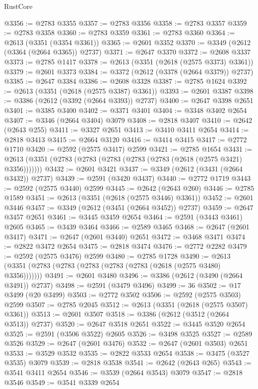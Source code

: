 \begin{lexlean}{RustCore}
\begin{coremodule}
@3356 := @2783 @3355
@3357 := @2783 @3356
@3358 := @2783 @3357
@3359 := @2783 @3358
@3360 := @2783 @3359
@3361 := @2783 @3360
@3364 := @2613 (@3351 (@3354 @3361))
@3365 := @2601 @3352
@3370 := @3349 (@2612 (@3364 (@2664 @3365)) @2737)
@3371 := @2647 @3370
@3372 := @2608 @3337
@3373 := @2785 @1417
@3378 := @2613 (@3351 (@2618 (@2575 @3373) @3361))
@3379 := @2601 @3373
@3384 := @3372 (@2612 (@3378 (@2664 @3379)) @2737)
@3385 := @2647 @3384
@3386 := @2608 @3328
@3387 := @2785 @1624
@3392 := @2613 (@3351 (@2618 (@2575 @3387) @3361))
@3393 := @2601 @3387
@3398 := @3386 (@2612 (@3392 (@2664 @3393)) @2737)
@3400 := @2647 @3398 @2651
@3401 := @3385 @3400
@3402 := @3371 @3401
@3404 := @3348 @3402 @2654
@3407 := @3346 (@2664 @3404) @3079
@3408 := @2818 @3407
@3410 := @2642 (@2643 @255)
@3411 := @3327 @2651
@3413 := @3410 @3411 @2654
@3414 := @2818 @3413
@3415 := @2664 @3120
@3416 := @3414 @3415
@3417 := @2772 @1710
@3420 := @2592 (@2575 @3417) @2599
@3421 := @2785 @1654
@3431 := @2613 (@3351 (@2783 (@2783 (@2783 (@2783 (@2783 (@2618 (@2575 @3421) @3356)))))))
@3432 := @2601 @3421
@3437 := @3349 (@2612 (@3431 (@2664 @3432)) @2737)
@3439 := @2591 (@3420 @3437)
@3440 := @2772 @1719
@3443 := @2592 (@2575 @3440) @2599
@3445 := @2642 (@2643 @260)
@3446 := @2785 @1589
@3451 := @2613 (@3351 (@2618 (@2575 @3446) @3361))
@3452 := @2601 @3446
@3457 := @3349 (@2612 (@3451 (@2664 @3452)) @2737)
@3459 := @2647 @3457 @2651
@3461 := @3445 @3459 @2654
@3464 := @2591 (@3443 @3461) @2605
@3465 := @3439 @3464
@3466 := @2589 @3465
@3468 := @2647 (@2601 @3417)
@3471 := @2647 (@2601 @3440) @2651
@3472 := @3468 @3471
@3474 := @2822 @3472 @2654
@3475 := @2818 @3474
@3476 := @2772 @2282
@3479 := @2592 (@2575 @3476) @2599
@3480 := @2785 @1728
@3490 := @2613 (@3351 (@2783 (@2783 (@2783 (@2783 (@2783 (@2618 (@2575 @3480) @3356)))))))
@3491 := @2601 @3480
@3496 := @3386 (@2612 (@3490 (@2664 @3491)) @2737)
@3498 := @2591 (@3479 @3496)
@3499 := 36
@3502 := @17 @3499 (@20 @3499)
@3503 := @2772 @3502
@3506 := @2592 (@2575 @3503) @2599
@3507 := @2785 @2045
@3512 := @2613 (@3351 (@2618 (@2575 @3507) @3361))
@3513 := @2601 @3507
@3518 := @3386 (@2612 (@3512 (@2664 @3513)) @2737)
@3520 := @2647 @3518 @2651
@3522 := @3445 @3520 @2654
@3525 := @2591 (@3506 @3522) @2605
@3526 := @3498 @3525
@3527 := @2589 @3526
@3529 := @2647 (@2601 @3476)
@3532 := @2647 (@2601 @3503) @2651
@3533 := @3529 @3532
@3535 := @2822 @3533 @2654
@3538 := @3475 (@3527 @3535) @3079
@3539 := @2818 @3538
@3541 := @2642 (@2643 @265)
@3543 := @3541 @3411 @2654
@3546 := @3539 (@2664 @3543) @3079
@3547 := @2818 @3546
@3549 := @3541 @3339 @2654

\end{coremodule}
\end{lexlean}
